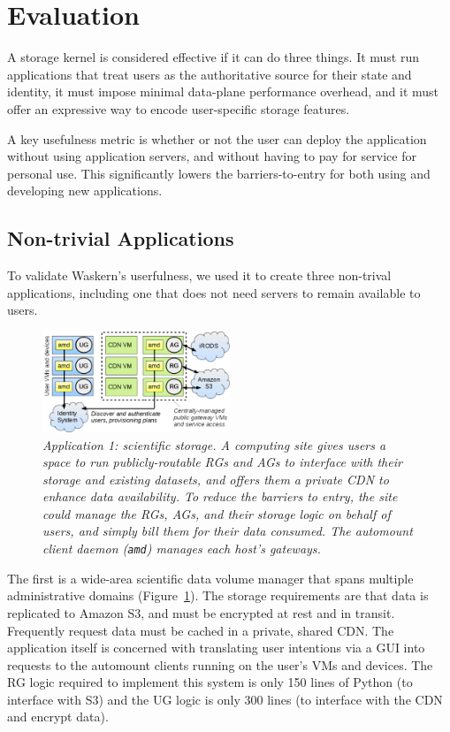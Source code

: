 \section{Evaluation}

A storage kernel is considered effective if it can do three things.  It must
run applications that treat users as the authoritative source for their state and identity,
it must impose minimal data-plane performance overhead, and it must offer an expressive way to
encode user-specific storage features.

A key usefulness metric is whether or not the user can deploy the application
without using application servers, and without having to pay for service for
personal use.  This significantly lowers the barriers-to-entry for both using and
developing new applications.

\subsection{Non-trivial Applications}

To validate Waskern's userfulness, we used it to create three non-trival
applications, including one that does not need servers to remain available to
users.

\begin{figure}[t!]
\centering
\includegraphics[width=0.5\textwidth]{figures/science-cloud}
\caption{\it Application 1: scientific storage.  A computing site gives users a
   space to run publicly-routable RGs and AGs to interface with their storage
   and existing datasets, and offers them a private CDN to enhance data
   availability.  To reduce the barriers to entry, the site could manage the
   RGs, AGs, and their storage logic on behalf of users, and simply bill them
   for their data consumed.  The automount client daemon (\texttt{amd}) manages
   each host's gateways.}
\label{fig:science-cloud}
\end{figure}


The first is a wide-area scientific data volume manager that spans
multiple administrative domains (Figure~\ref{fig:science-cloud}). The storage requirements are that
data is replicated to Amazon S3, and must be encrypted at rest and in transit.
Frequently request data must be cached in a private, shared CDN. The application
itself is concerned with translating user intentions via a GUI into requests to
the automount clients running on the user's VMs and devices. The RG logic required to
implement this system is only 150 lines of Python (to interface with S3) and the
UG logic is only 300 lines (to interface with the CDN and encrypt data).

